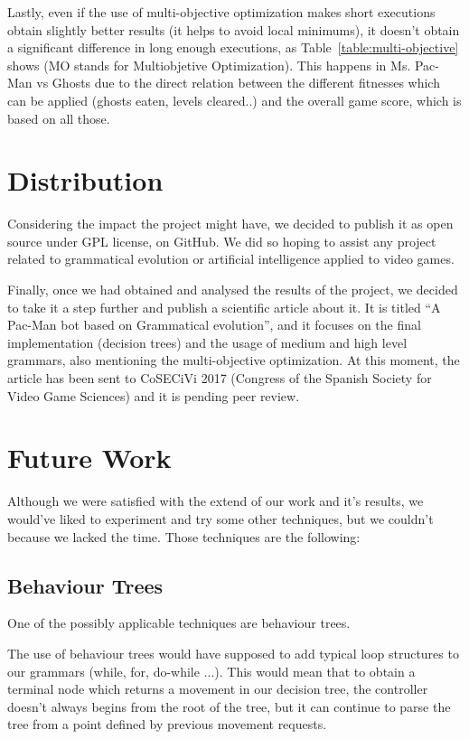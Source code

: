 Lastly, even if the use of multi-objective optimization makes short executions obtain slightly better results (it helps to avoid local minimums), it doesn't obtain a significant difference in long enough executions, as Table~\ref{table:multi-objective} shows (MO stands for Multiobjetive Optimization). This happens in Ms. Pac-Man vs Ghosts due to the direct relation between the different fitnesses which can be applied (ghosts eaten, levels cleared..) and the overall game score, which is based on all those.

\section{Distribution}
Considering the impact the project might have, we decided to publish it as open source under GPL \cite{licenseThesisGit} license, on GitHub. We did so hoping to assist any project related to grammatical evolution or artificial intelligence applied to video games. 

Finally, once we had obtained and analysed the results of the project, we decided to take it a step further and publish a scientific article about it. It is titled ``A Pac-Man bot based on Grammatical evolution'', and it focuses on the final implementation (decision trees) and the usage of medium and high level grammars, also mentioning the multi-objective optimization. At this moment, the article has been sent to CoSECiVi 2017 (Congress of the Spanish Society for Video Game Sciences) and it is pending peer review.

\section{Future Work}
Although we were satisfied with the extend of our work and it's results, we would've liked to experiment and try some other techniques, but we couldn't because we lacked the time. Those techniques are the following:

\subsection{Behaviour Trees}
One of the possibly applicable techniques are behaviour trees.

The use of behaviour trees would have supposed to add typical loop structures to our grammars (while, for, do-while ...). This would mean that to obtain a terminal node which returns a movement in our decision tree, the controller doesn't always begins from the root of the tree, but it can continue to parse the tree from a point defined by previous movement requests.

